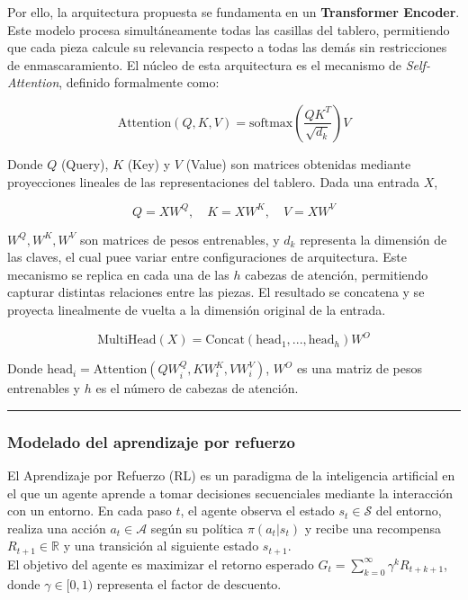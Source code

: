 \documentclass[12pt, a4paper]{article}
\let\cite\supercite
\begin{document}
Por ello, la arquitectura propuesta se fundamenta en un \textbf{Transformer Encoder}. Este modelo procesa simultáneamente todas las casillas del tablero, permitiendo que cada pieza calcule su relevancia respecto a todas las demás sin restricciones de enmascaramiento. El núcleo de esta arquitectura es el mecanismo de \textit{Self-Attention}\cite{NIPS2017_3f5ee243}, definido formalmente como:

\[
\text{Attention}(Q, K, V) = \text{softmax}\left(\frac{QK^T}{\sqrt{d_k}}\right)V
\]
    
Donde $Q$ (Query), $K$ (Key) y $V$ (Value) son matrices obtenidas mediante proyecciones lineales de las representaciones del tablero. Dada una entrada $X$,   

$$Q=XW^Q, \quad K=XW^K, \quad V=XW^V$$

$W^Q, W^K, W^V$ son matrices de pesos entrenables, y $d_k$ representa la dimensión de las claves, el cual puee variar entre configuraciones de arquitectura. Este mecanismo se replica en cada una de las $h$ cabezas de atención, permitiendo capturar distintas relaciones entre las piezas. El resultado se concatena y se proyecta linealmente de vuelta a la dimensión original de la entrada. 

$$\text{MultiHead}(X) = \text{Concat}(\text{head}_1, ..., \text{head}_h)W^O$$

Donde $\text{head}_i = \text{Attention}(QW_i^Q, KW_i^K, VW_i^V)$, $W^O$ es una matriz de pesos entrenables y $h$ es el número de cabezas de atención. 

\rule{\textwidth}{0.2pt}
\subsubsection{Modelado del aprendizaje por refuerzo}

El Aprendizaje por Refuerzo (RL) es un paradigma de la inteligencia artificial en el que un agente aprende a tomar decisiones secuenciales mediante la interacción con un entorno. En cada paso $t$, el agente observa el estado $s_t \in \mathcal{S}$ del entorno, realiza una acción $a_t \in \mathcal{A}$ según su política $\pi(a_t|s_t)$ y recibe una recompensa $R_{t+1} \in \mathbb{R}$ y una transición al siguiente estado $s_{t+1}$. \\
El objetivo del agente es maximizar el retorno esperado $G_t = \sum_{k=0}^{\infty} \gamma^k R_{t+k+1}$, donde $\gamma \in [0, 1)$ representa el factor de descuento.
\end{document}
